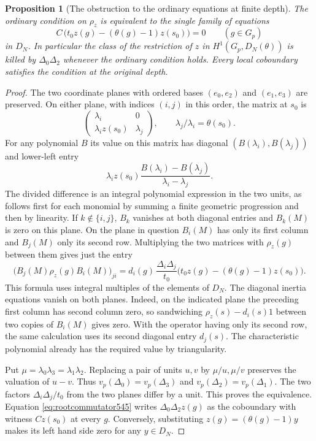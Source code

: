 \documentclass[a4paper,11pt]{article}
\newtheorem{proposition}{Proposition}[section]
\theoremstyle{definition}
\theoremstyle{remark}
\numberwithin{equation}{section}
\begin{document}
\begin{proposition}[The obstruction to the ordinary equations at finite depth]
\leavevmode\label{prop:rootpolynomial545}
The ordinary condition on \(\rho_z\) is equivalent to the single
family of equations
\begin{equation}
     C\,\bigl(t_0 z(g)-(\theta(g)-1)z(s_0)\bigr)=0
                             \qquad(g\in G_p)
     \label{eq:rootcommutator545}
\end{equation}
in \(D_N\). In particular the class of the restriction of \(z\)
in \(H^1(G_p,D_N(\theta))\) is killed by \(\Delta_0\Delta_2\) whenever
the ordinary condition holds. Every local coboundary satisfies
the condition at the original depth.
\end{proposition}
\begin{proof}
The two coordinate planes with ordered bases \((e_0,e_2)\)
and \((e_1,e_3)\) are preserved. On either plane, with indices
\((i,j)\) in this order, the matrix at \(s_0\) is
\[
      \begin{pmatrix}
          \lambda_i&0\\ \lambda_i z(s_0)&\lambda_j
      \end{pmatrix},\qquad \lambda_j/\lambda_i=\theta(s_0).
\]
For any polynomial \(B\) its value on this matrix has diagonal
\((B(\lambda_i),B(\lambda_j))\) and lower-left entry
\[
       \lambda_i z(s_0)
       \frac{B(\lambda_i)-B(\lambda_j)}{\lambda_i-\lambda_j}.
\]
The divided difference is an integral polynomial expression
in the two units, as follows first for each monomial by summing
a finite geometric progression and then by linearity. If
\(k\notin\{i,j\}\), \(B_k\) vanishes at both diagonal entries
and \(B_k(M)\) is zero on this plane. On the plane in question
\(B_i(M)\) has only its first column and \(B_j(M)\) only its
second row. Multiplying the two matrices with \(\rho_z(g)\)
between them gives just the entry
\[
    \bigl(B_j(M)\rho_z(g)B_i(M)\bigr)_{ji}
       =d_i(g)\,\frac{\Delta_i\Delta_j}{t_0}
            \bigl(t_0z(g)-(\theta(g)-1)z(s_0)\bigr).
\]
This formula uses integral multiples of the elements of \(D_N\).
The diagonal inertia equations vanish on both planes. Indeed,
on the indicated plane the preceding first column has second
column zero, so sandwiching \(\rho_z(s)-d_i(s)1\) between
two copies of \(B_i(M)\) gives zero. With the operator having
only its second row, the same calculation uses its second
diagonal entry \(d_j(s)\). The characteristic polynomial
already has the required value by triangularity.

Put \(\mu=\lambda_0\lambda_3=\lambda_1\lambda_2\).
Replacing a pair of units \(u,v\) by \(\mu/u,\mu/v\)
preserves the valuation of \(u-v\). Thus
\(v_p(\Delta_0)=v_p(\Delta_3)\) and \(v_p(\Delta_2)=v_p(\Delta_1)\).
The two factors \(\Delta_i\Delta_j/t_0\) from the two planes
differ by a unit. This proves the equivalence. Equation
\eqref{eq:rootcommutator545} writes \(\Delta_0\Delta_2 z(g)\)
as the coboundary with witness \(Cz(s_0)\) at every \(g\).
Conversely, substituting \(z(g)=(\theta(g)-1)y\) makes its
left hand side zero for any \(y\in D_N\).
\end{proof}
\end{document}
